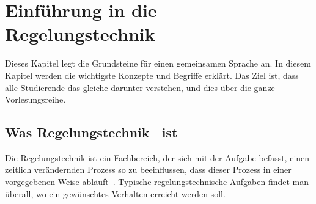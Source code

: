 	
\chapter{Einführung in die Regelungstechnik}

	Dieses Kapitel legt die Grundsteine für einen gemeinsamen Sprache an. In diesem Kapitel werden die wichtigste Konzepte und Begriffe erklärt. Das Ziel ist, dass alle Studierende das gleiche darunter verstehen, und dies über die ganze Vorlesungsreihe.
	
\section{Was \glqq Regelungstechnik\grqq~ ist}

Die Regelungstechnik ist ein Fachbereich, der sich mit der Aufgabe befasst, \glqq einen zeitlich verändernden Prozess so zu beeinflussen, dass dieser Prozess in einer vorgegebenen Weise abläuft\grqq~\cite{LunzeRT2014}. Typische regelungstechnische Aufgaben findet man überall, wo ein gewünschtes Verhalten erreicht werden soll.

